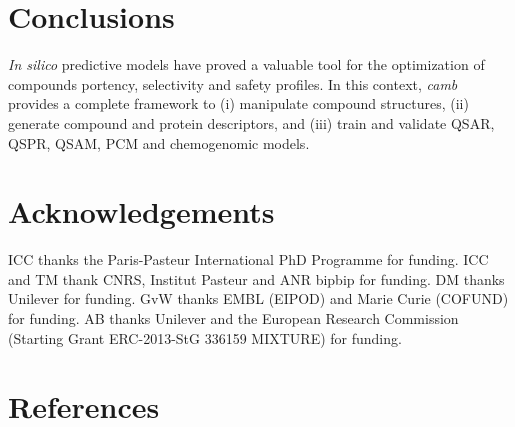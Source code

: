 \documentclass{bioinfo}
\begin{document}
\section{Conclusions}
{\it In silico} predictive models have proved a valuable
tool for the optimization of compounds portency, selectivity and safety profiles.
In this context, {\it camb} provides a complete framework
to (i) manipulate compound structures, (ii) generate compound and protein descriptors, and
(iii) train and validate 
QSAR, QSPR, QSAM, PCM and chemogenomic models.

\section{Acknowledgements}
ICC thanks the Paris-Pasteur International PhD Programme for funding.
ICC and TM thank CNRS, Institut Pasteur and ANR bipbip for funding.
DM thanks Unilever for funding.
GvW thanks EMBL (EIPOD) and Marie Curie (COFUND) for funding.
AB thanks Unilever and the European Research Commission (Starting Grant ERC-2013-StG 336159 MIXTURE) for funding.
\section{References}



\end{document}
